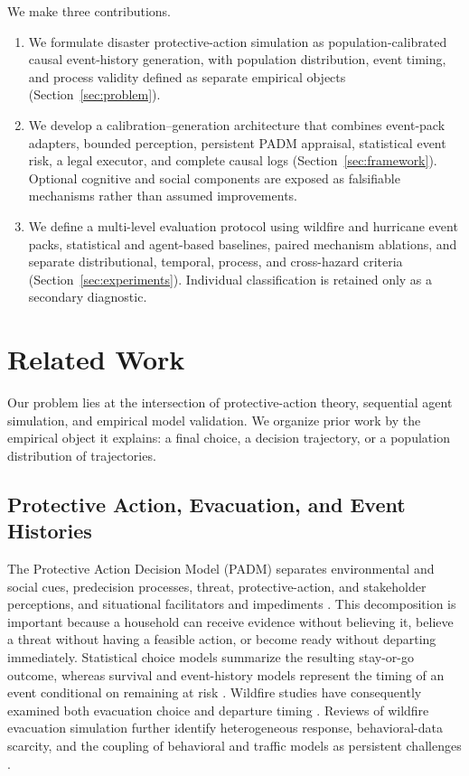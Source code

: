 \documentclass[journal]{IEEEtran}
\begin{document}
We make three contributions.
\begin{enumerate}
    \item We formulate disaster protective-action simulation as
    population-calibrated causal event-history generation, with population
    distribution, event timing, and process validity defined as separate
    empirical objects (Section~\ref{sec:problem}).
    \item We develop a calibration--generation architecture that combines
    event-pack adapters, bounded perception, persistent PADM appraisal,
    statistical event risk, a legal executor, and complete causal logs
    (Section~\ref{sec:framework}). Optional cognitive and social components
    are exposed as falsifiable mechanisms rather than assumed improvements.
    \item We define a multi-level evaluation protocol using wildfire and
    hurricane event packs, statistical and agent-based baselines, paired
    mechanism ablations, and separate distributional, temporal, process, and
    cross-hazard criteria (Section~\ref{sec:experiments}). Individual
    classification is retained only as a secondary diagnostic.
\end{enumerate}

\section{Related Work}
Our problem lies at the intersection of protective-action theory, sequential
agent simulation, and empirical model validation. We organize prior work by
the empirical object it explains: a final choice, a decision trajectory, or a
population distribution of trajectories.

\subsection{Protective Action, Evacuation, and Event Histories}
The Protective Action Decision Model (PADM) separates environmental and
social cues, predecision processes, threat, protective-action, and stakeholder
perceptions, and situational facilitators and impediments
\cite{lindell2012padm}. This decomposition is important because a household
can receive evidence without believing it, believe a threat without having a
feasible action, or become ready without departing immediately. Statistical
choice models summarize the resulting
stay-or-go outcome, whereas survival and event-history models represent the
timing of an event conditional on remaining at risk
\cite{cox1972regression}. Wildfire studies have consequently examined both
evacuation choice and departure timing \cite{toledo2018analysis}. Reviews of
wildfire evacuation simulation further identify heterogeneous response,
behavioral-data scarcity, and the coupling of behavioral and traffic models
as persistent challenges \cite{beyki2023evacuation}.
\end{document}
